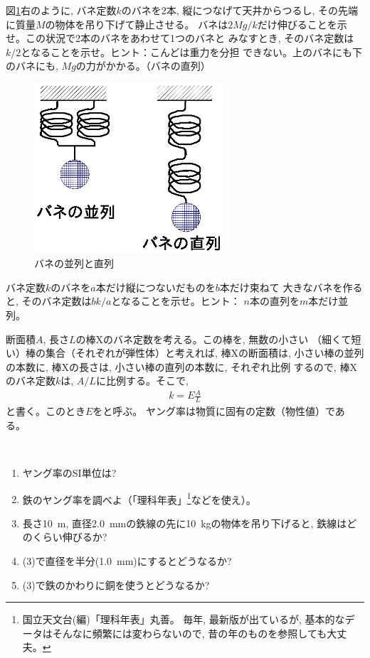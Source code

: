 \begin{q}\label{q:spring_double_series}
図\ref{fig:spring_serial}右のように, バネ定数$k$のバネを2本, 
縦につなげて天井からつるし, その先端に質量$M$の物体を吊り下げて静止させる。
バネは$2Mg/k$だけ伸びることを示せ。この状況で2本のバネをあわせて1つのバネと
みなすとき, そのバネ定数は$k/2$となることを示せ。ヒント：こんどは重力を分担
できない。上のバネにも下のバネにも, $Mg$の力がかかる。（バネの直列）
\mv
\begin{figure}[h]
    \centering
    \includegraphics[width=7cm]{spring_serial.eps}
    \caption{バネの並列と直列}\label{fig:spring_serial}
\end{figure}
\end{q}

%
\begin{q}\label{q:spring_big}
バネ定数$k$のバネを$a$本だけ縦につないだものを$b$本だけ束ねて
大きなバネを作ると, そのバネ定数は$bk/a$となることを示せ。ヒント：
$n$本の直列を$m$本だけ並列。
\end{q}
\mv


断面積$A$, 長さ$L$の棒Xのバネ定数を考える。この棒を, 無数の小さい
（細くて短い）棒の集合（それぞれが弾性体）と考えれば, 棒Xの断面積は, 
小さい棒の並列の本数に, 棒Xの長さは, 小さい棒の直列の本数に, それぞれ比例
するので, 棒Xのバネ定数$k$は, $A/L$に比例する。そこで, 
\begin{eqnarray}
k=E\frac{A}{L}
\end{eqnarray}
と書く。このとき$E$をと呼ぶ。
ヤング率は物質に固有の定数（物性値）である。

\begin{q}\label{q:YoungModulus}　
\begin{enumerate}
\item ヤング率のSI単位は?
\item 鉄のヤング率を調べよ（「理科年表」\footnote{国立天文台(編)「理科年表」丸善。
毎年, 最新版が出ているが, 基本的なデータはそんなに頻繁には変わらないので, 昔の年のものを参照しても大丈夫。}などを使え）。
\item 長さ10~m, 直径2.0~mmの鉄線の先に10~kgの物体を吊り下げると, 鉄線はどのくらい伸びるか?
\item (3)で直径を半分(1.0~mm)にするとどうなるか?
\item (3)で鉄のかわりに銅を使うとどうなるか?
\end{enumerate}
\end{q}
\mv

